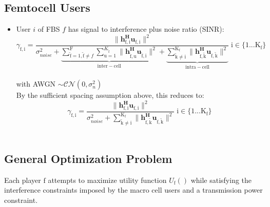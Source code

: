 \documentclass[12pt,a4paper]{report}
\begin{document}
\subsection{Femtocell Users}
\begin{itemize}

\item User $i$ of FBS $f$ has signal to interference plus noise ratio (SINR):
	\begin{equation*}
	\gamma_{\mathrm{f,i}} = \frac{\|\mathbf{h^H_{\mathrm{f,i}}u_{\mathrm{f,i}}}\|^2}
	{\sigma^2_{noise}   +
	\underbrace{
	 \sum_{\mathrm{\tilde{f}}=1,\mathrm{\tilde{f}}\neq f}^{\mathrm{F}} \sum_{\mathrm{u=1}}^{K_{\mathrm{\tilde{f}}}}
	\|\mathbf{h^H_{\mathrm{\tilde{f},u}}u_{\mathrm{\tilde{f},i}}}\|^2}_{\mathrm{inter-cell}}
	 + 
	 \underbrace{
	 \sum_{\mathrm{\tilde{k}\neq i}}^{\mathrm{K_f}}
	 \|\mathbf{h^H_{\mathrm{f,\tilde{k}}}u_{\mathrm{f,\tilde{k}}}}\|^2}_{\mathrm{intra-cell}}}
	  \; \mathrm{i \in \{1 ... K_f\}}\end{equation*}
\\
with AWGN $\sim \mathcal{CN}(0,\sigma^2_n)$
\\

By the sufficient spacing assumption above, this reduces to:
	\begin{equation*}
	\gamma_{\mathrm{f,i}} = \frac{\|\mathbf{h^H_{\mathrm{f,i}}u_{\mathrm{f,i}}}\|^2}
	{\sigma^2_{noise} 
	 + \sum_{\mathrm{\tilde{k}\neq i}}^{\mathrm{K_f}}
	  \|\mathbf{h^H_{\mathrm{f,\tilde{k}}}u_{\mathrm{f,\tilde{k}}}}\|^2}
	  \; \mathrm{i \in \{1 ... K_f\}}
	\end{equation*}
\\


\end{itemize}





\subsection{General Optimization Problem}\label{genproblem}

Each player $\text{f}$ attempts to maximize utility function $U_{\text{f}}()$ while satisfying the interference constraints imposed by the macro cell users and a transmission power constraint. 
\par
\end{document}
